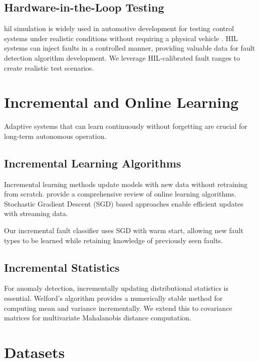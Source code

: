 \subsection{Hardware-in-the-Loop Testing}

\gls{hil} simulation is widely used in automotive development for testing control systems under realistic conditions without requiring a physical vehicle \parencite{fathy2006review, bringmann2008model}. HIL systems can inject faults in a controlled manner, providing valuable data for fault detection algorithm development. We leverage HIL-calibrated fault ranges to create realistic test scenarios.

\section{Incremental and Online Learning}

Adaptive systems that can learn continuously without forgetting are crucial for long-term autonomous operation.

\subsection{Incremental Learning Algorithms}

Incremental learning methods update models with new data without retraining from scratch. \textcite{losing2018incremental} provide a comprehensive review of online learning algorithms. Stochastic Gradient Descent (SGD) based approaches \parencite{pmlr2011online} enable efficient updates with streaming data.

Our incremental fault classifier uses SGD with warm start, allowing new fault types to be learned while retaining knowledge of previously seen faults.

\subsection{Incremental Statistics}

For anomaly detection, incrementally updating distributional statistics is essential. Welford's algorithm \parencite{welford1962note} provides a numerically stable method for computing mean and variance incrementally. We extend this to covariance matrices for multivariate Mahalanobis distance computation.

\section{Datasets}


